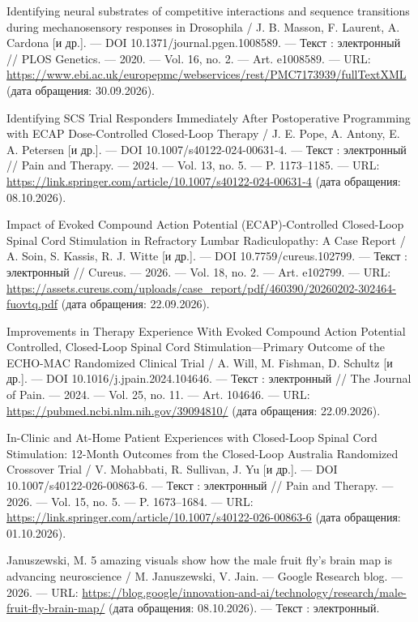 \begin{list}{}{\setlength{\leftmargin}{10mm}\setlength{\labelwidth}{8mm}\setlength{\labelsep}{2mm}\setlength{\itemsep}{0pt}\setlength{\parsep}{0pt}\setlength{\topsep}{0pt}}
\item[158.] Identifying neural substrates of competitive interactions and sequence transitions during mechanosensory responses in Drosophila / J. B. Masson, F. Laurent, A. Cardona [и др.]. — DOI 10.1371/journal.pgen.1008589. — Текст : электронный // PLOS Genetics. — 2020. — Vol. 16, no. 2. — Art. e1008589. — URL: \url{https://www.ebi.ac.uk/europepmc/webservices/rest/PMC7173939/fullTextXML} (дата обращения: 30.09.2026).
\item[159.] Identifying SCS Trial Responders Immediately After Postoperative Programming with ECAP Dose-Controlled Closed-Loop Therapy / J. E. Pope, A. Antony, E. A. Petersen [и др.]. — DOI 10.1007/s40122-024-00631-4. — Текст : электронный // Pain and Therapy. — 2024. — Vol. 13, no. 5. — P. 1173–1185. — URL: \url{https://link.springer.com/article/10.1007/s40122-024-00631-4} (дата обращения: 08.10.2026).
\item[160.] Impact of Evoked Compound Action Potential (ECAP)-Controlled Closed-Loop Spinal Cord Stimulation in Refractory Lumbar Radiculopathy: A Case Report / A. Soin, S. Kassis, R. J. Witte [и др.]. — DOI 10.7759/cureus.102799. — Текст : электронный // Cureus. — 2026. — Vol. 18, no. 2. — Art. e102799. — URL: \url{https://assets.cureus.com/uploads/case\_report/pdf/460390/20260202-302464-fuovtq.pdf} (дата обращения: 22.09.2026).
\item[161.] Improvements in Therapy Experience With Evoked Compound Action Potential Controlled, Closed-Loop Spinal Cord Stimulation—Primary Outcome of the ECHO-MAC Randomized Clinical Trial / A. Will, M. Fishman, D. Schultz [и др.]. — DOI 10.1016/j.jpain.2024.104646. — Текст : электронный // The Journal of Pain. — 2024. — Vol. 25, no. 11. — Art. 104646. — URL: \url{https://pubmed.ncbi.nlm.nih.gov/39094810/} (дата обращения: 22.09.2026).
\item[162.] In-Clinic and At-Home Patient Experiences with Closed-Loop Spinal Cord Stimulation: 12-Month Outcomes from the Closed-Loop Australia Randomized Crossover Trial / V. Mohabbati, R. Sullivan, J. Yu [и др.]. — DOI 10.1007/s40122-026-00863-6. — Текст : электронный // Pain and Therapy. — 2026. — Vol. 15, no. 5. — P. 1673–1684. — URL: \url{https://link.springer.com/article/10.1007/s40122-026-00863-6} (дата обращения: 01.10.2026).
\item[163.] Januszewski, M. 5 amazing visuals show how the male fruit fly's brain map is advancing neuroscience / M. Januszewski, V. Jain. — Google Research blog. — 2026. — URL: \url{https://blog.google/innovation-and-ai/technology/research/male-fruit-fly-brain-map/} (дата обращения: 08.10.2026). — Текст : электронный.

\end{list}
